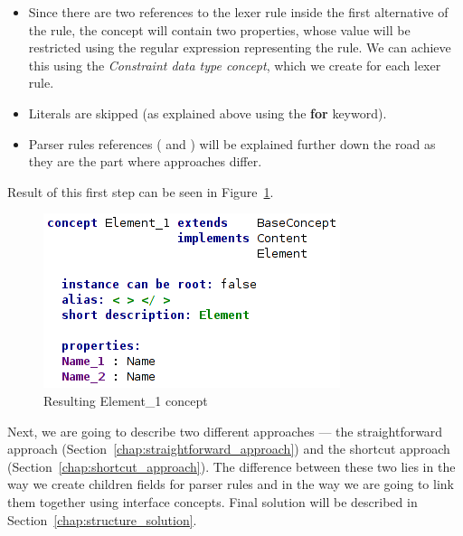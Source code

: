 \begin{itemize}
	\item Since there are two references to the  lexer rule inside the first alternative of the  rule, the  concept will contain two properties, whose value will be restricted using the regular expression representing the  rule.
	We can achieve this using the \textit{Constraint data type concept}, which we create for each lexer rule.

	\item Literals are skipped (as explained above using the \textbf{for} keyword).

	\item Parser rules references ( and ) will be explained further down the road as they are the part where approaches differ.
\end{itemize}

Result of this first step can be seen in Figure~\ref{fig:element_concept_common}.

\begin{figure}[ht]
	\centering
	\includegraphics[scale=0.75]{./img/element_concept_common.png}
	\caption{Resulting Element{\_}1 concept}
	\label{fig:element_concept_common}
\end{figure}

Next, we are going to describe two different approaches --- the straightforward approach (Section~\ref{chap:straightforward_approach}) and the shortcut approach (Section~\ref{chap:shortcut_approach}).
The difference between these two lies in the way we create children fields for parser rules and in the way we are going to link them together using interface concepts.
Final solution will be described in Section~\ref{chap:structure_solution}.





